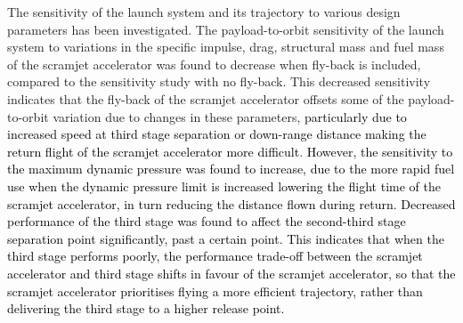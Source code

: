 The sensitivity of the launch system and its trajectory to various design parameters has been investigated. 
The payload-to-orbit sensitivity of the launch system to variations in the specific impulse, drag, structural mass and fuel mass of the scramjet accelerator was found to decrease when fly-back is included, compared to the sensitivity study with no fly-back. This decreased sensitivity indicates that the fly-back of the scramjet accelerator offsets some of the payload-to-orbit variation due to changes in these parameters, \textcolor{black}{particularly due to increased speed at third stage separation or down-range distance making the return flight of the scramjet accelerator more difficult}. \textcolor{black}{However, the sensitivity to the maximum dynamic pressure was found to increase, due to the more rapid fuel use when the dynamic pressure limit is increased lowering the flight time of the scramjet accelerator, in turn reducing the distance flown during return. Decreased performance of the third stage was found to affect the second-third stage separation point significantly, past a certain point. This indicates that when the third stage performs poorly, the performance trade-off between the scramjet accelerator and third stage shifts in favour of the scramjet accelerator, so that the scramjet accelerator prioritises flying a more efficient trajectory, rather than delivering the third stage to a higher release point.}

